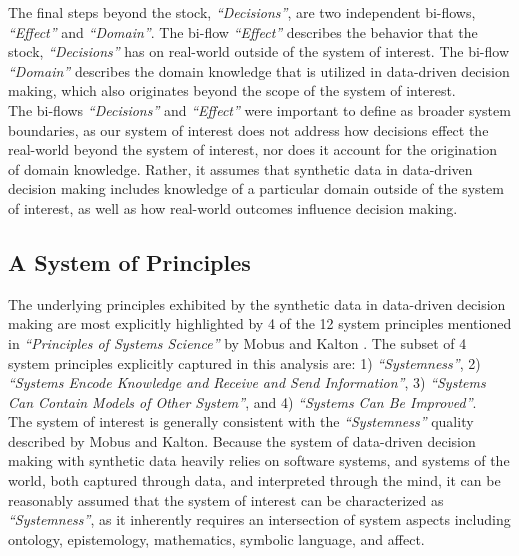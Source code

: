 \documentclass{article}
\begin{document}
\newpage
The final steps beyond the stock, \textit{``Decisions''}, are two independent bi-flows, \textit{``Effect''} and \textit{``Domain''}. The bi-flow \textit{``Effect''} describes the behavior that the stock, \textit{``Decisions''} has on real-world outside of the system of interest. The bi-flow \textit{``Domain''} describes the domain knowledge that is utilized in data-driven decision making, which also originates beyond the scope of the system of interest. \\

The bi-flows \textit{``Decisions''} and \textit{``Effect''} were important to define as broader system boundaries, as our system of interest does not address how decisions effect the real-world beyond the system of interest, nor does it account for the origination of domain knowledge. Rather, it assumes that synthetic data in data-driven decision making includes knowledge of a particular domain outside of the system of interest, as well as how real-world outcomes influence decision making. \\

\subsection*{A System of Principles}

The underlying principles exhibited by the synthetic data in data-driven decision making are most explicitly highlighted by 4 of the 12 system principles mentioned in \textit{``Principles of Systems Science''} by Mobus and Kalton \cite{mobus}. The subset of 4 system principles explicitly captured in this analysis are: 1) \textit{``Systemness''}, 2) \textit{``Systems Encode Knowledge and Receive and Send Information''}, 3) \textit{``Systems Can Contain Models of Other System''}, and 4) \textit{``Systems Can Be Improved''}. \\

The system of interest is generally consistent with the \textit{``Systemness''} quality described by Mobus and Kalton. Because the system of data-driven decision making with synthetic data heavily relies on software systems, and systems of the world, both captured through data, and interpreted through the mind, it can be reasonably assumed that the system of interest can be characterized as \textit{``Systemness''}, as it inherently requires an intersection of system aspects including ontology, epistemology, mathematics, symbolic language, and affect. \\
\end{document}
